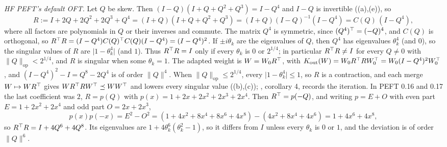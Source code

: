\emph{HF PEFT's default OFT.} Let $Q$ be skew. Then $(I-Q)(I+Q+Q^2+Q^3)=I-Q^4$ and $I-Q$ is invertible
((a),(e)), so
\begin{equation*}
  R:=I+2Q+2Q^2+2Q^3+Q^4=(I+Q)(I+Q+Q^2+Q^3)=(I+Q)(I-Q)^{-1}(I-Q^4)=C(Q)\,(I-Q^4),
\end{equation*}
where all factors are polynomials in $Q$ or their inverses and commute. The matrix $Q^4$ is symmetric, since
$(Q^4)^{\top}=(-Q)^4$, and $C(Q)$ is orthogonal, so $R^{\top} R=(I-Q^4)C(Q)^{\top} C(Q)(I-Q^4)=(I-Q^4)^2$. If $\pm i\theta_k$ are the
eigenvalues of $Q$, then $Q^4$ has eigenvalues $\theta_k^4$ (and $0$), so the singular values of $R$ are
$\lvert1-\theta_k^4\rvert$ (and $1$). Thus $R^{\top} R=I$ only if every $\theta_k$ is $0$ or $2^{1/4}$; in particular
$R^{\top} R\ne I$ for every $Q\ne0$ with $\lVert Q\rVert_{\mathrm{op}}<2^{1/4}$, and $R$ is singular when some $\theta_k=1$.
The adapted weight is $W=W_0R^{\top}$, with $K_{\mathrm{out}}(W)=W_0R^{\top} RW_0^{\top}=W_0(I-Q^4)^2W_0^{\top}$, and
$(I-Q^4)^2-I=Q^8-2Q^4$ is of order $\lVert Q\rVert^4$. When $\lVert Q\rVert_{\mathrm{op}}\le2^{1/4}$, every
$\lvert1-\theta_k^4\rvert\le1$, so $R$ is a contraction, and each merge $W\mapsto WR^{\top}$ gives
$WR^{\top} RW^{\top}\preceq WW^{\top}$ and lowers every singular value ((b),(c)); , corollary 4, records
the iteration. In PEFT 0.16 and 0.17 the last coefficient was $2$, $R=p(Q)$ with $p(x)=1+2x+2x^2+2x^3+2x^4$. Then
$R^{\top}=p(-Q)$, and writing $p=E+O$ with even part $E=1+2x^2+2x^4$ and odd part $O=2x+2x^3$,
\begin{equation*}
  p(x)p(-x)=E^2-O^2=(1+4x^2+8x^4+8x^6+4x^8)-(4x^2+8x^4+4x^6)=1+4x^6+4x^8,
\end{equation*}
so $R^{\top} R=I+4Q^6+4Q^8$. Its eigenvalues are $1+4\theta_k^6(\theta_k^2-1)$, so it differs from $I$ unless every $\theta_k$ is $0$
or $1$, and the deviation is of order $\lVert Q\rVert^6$.

